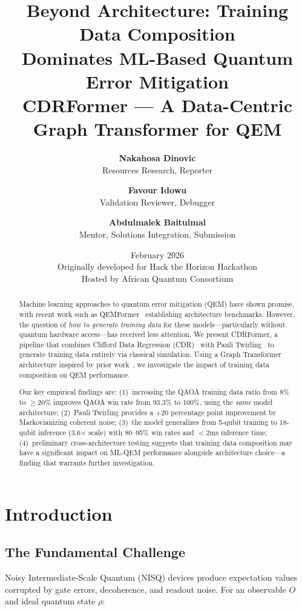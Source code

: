 \documentclass[11pt, a4paper]{article}
\title{\textbf{Beyond Architecture: Training Data Composition\\Dominates ML-Based Quantum Error Mitigation} \\ \large CDRFormer --- A Data-Centric Graph Transformer for QEM}
\author{
\textbf{Nakahosa Dinovic} \\ Resources Research, Reporter \\
\and
\textbf{Favour Idowu} \\ Validation Reviewer, Debugger \\
\and
\textbf{Abdulmalek Baitulmal} \\ Mentor, Solutions Integration, Submission
}
\date{February 2026 \\ \small Originally developed for Hack the Horizon Hackathon \\ Hosted by African Quantum Consortium}
\begin{document}
\maketitle

\begin{abstract}
Machine learning approaches to quantum error mitigation (QEM) have shown
promise, with recent work such as QEMFormer~\cite{bao2025qemformer}
establishing architecture benchmarks. However, the question of \emph{how to
generate training data} for these models---particularly without quantum hardware
access---has received less attention. We present CDRFormer, a pipeline that
combines Clifford Data Regression (CDR)~\cite{czarnik2021cdr} with Pauli
Twirling~\cite{wallman2016twirling} to generate training data entirely via
classical simulation. Using a Graph Transformer architecture inspired by prior
work~\cite{bao2025qemformer, bao2025gtranqem}, we investigate the impact of
training data composition on QEM performance.

Our key empirical findings are: (1)~increasing the QAOA training data ratio
from 8\% to $\geq$20\% improves QAOA win rate from 93.3\% to 100\%, using the
\emph{same} model architecture; (2)~Pauli Twirling provides a +20 percentage
point improvement by Markovianizing coherent noise; (3)~the model generalizes
from 5-qubit training to 18-qubit inference (3.6$\times$ scale) with 80--95\%
win rates and $<$2ms inference time; (4)~preliminary cross-architecture
testing suggests that training data composition may have a significant impact
on ML-QEM performance alongside architecture choice---a finding that warrants
further investigation.
\end{abstract}

\tableofcontents
\newpage

\section{Introduction}
\label{sec:intro}

\subsection{The Fundamental Challenge}

Noisy Intermediate-Scale Quantum (NISQ) devices produce expectation values
corrupted by gate errors, decoherence, and readout noise. For an observable $O$
and ideal quantum state $\rho$:
\end{document}
